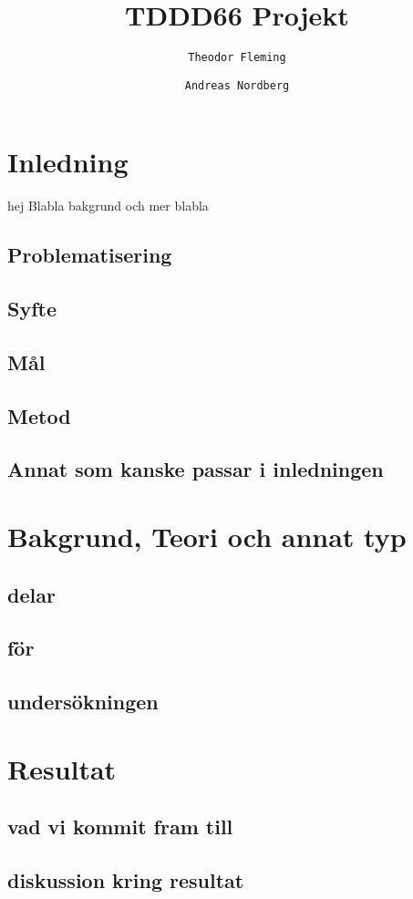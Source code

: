 \documentclass[10pt,a4paper]{article}
\author{
  \texttt{Theodor Fleming}
  \and
  \texttt{Andreas Nordberg}
}
\begin{document}

\title{TDDD66 Projekt}
\maketitle

\cleardoublepage

\section{Inledning}
hej
Blabla bakgrund och mer blabla

\subsection{Problematisering}

\subsection{Syfte}

\subsection{Mål}

\subsection{Metod}

\subsection{Annat som kanske passar i inledningen}

\newpage

\section{Bakgrund, Teori och annat typ}

\subsection{delar}

\subsection{för}

\subsection{undersökningen}

\newpage

\section{Resultat}

\subsection{vad vi kommit fram till}

\subsection{diskussion kring resultat}
\end{document}
